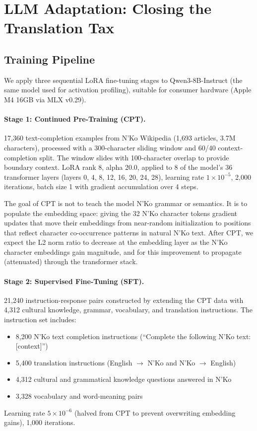 \documentclass[11pt]{article}
\begin{document}
\section{LLM Adaptation: Closing the Translation Tax}
\label{sec:adaptation}

\subsection{Training Pipeline}

We apply three sequential LoRA fine-tuning stages to Qwen3-8B-Instruct (the same model used for activation profiling), suitable for consumer hardware (Apple M4 16GB via MLX v0.29).

\paragraph{Stage 1: Continued Pre-Training (CPT).}
17,360 text-completion examples from N'Ko Wikipedia (1,693 articles, 3.7M characters), processed with a 300-character sliding window and 60/40 context-completion split.
The window slides with 100-character overlap to provide boundary context.
LoRA rank 8, alpha 20.0, applied to 8 of the model's 36 transformer layers (layers 0, 4, 8, 12, 16, 20, 24, 28), learning rate $1 \times 10^{-5}$, 2,000 iterations, batch size 1 with gradient accumulation over 4 steps.

The goal of CPT is not to teach the model N'Ko grammar or semantics.
It is to populate the embedding space: giving the 32 N'Ko character tokens gradient updates that move their embeddings from near-random initialization to positions that reflect character co-occurrence patterns in natural N'Ko text.
After CPT, we expect the L2 norm ratio to decrease at the embedding layer as the N'Ko character embeddings gain magnitude, and for this improvement to propagate (attenuated) through the transformer stack.

\paragraph{Stage 2: Supervised Fine-Tuning (SFT).}
21,240 instruction-response pairs constructed by extending the CPT data with 4,312 cultural knowledge, grammar, vocabulary, and translation instructions.
The instruction set includes:
\begin{itemize}
\item 8,200 N'Ko text completion instructions (``Complete the following N'Ko text: [context]'')
\item 5,400 translation instructions (English $\to$ N'Ko and N'Ko $\to$ English)
\item 4,312 cultural and grammatical knowledge questions answered in N'Ko
\item 3,328 vocabulary and word-meaning pairs
\end{itemize}
Learning rate $5 \times 10^{-6}$ (halved from CPT to prevent overwriting embedding gains), 1,000 iterations.
\end{document}
